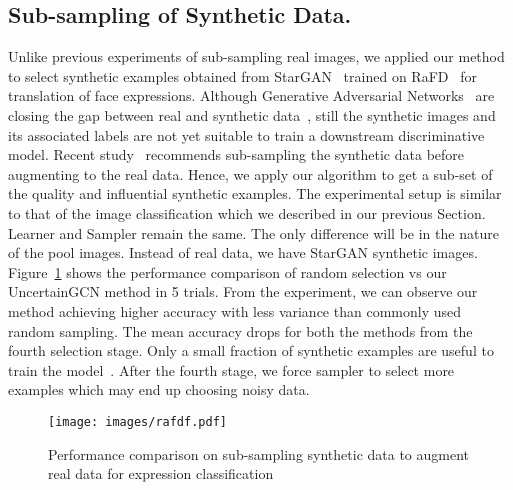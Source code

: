\subsection{Sub-sampling of Synthetic Data.} 


Unlike previous experiments of sub-sampling real images, we applied our method to select synthetic examples obtained from StarGAN~\cite{choi2018stargan} trained on RaFD~\cite{langner2010presentation} for translation of face 
expressions.
Although Generative Adversarial Networks~\cite{goodfellow2014generative} are closing the gap between real and synthetic data~\cite{ravuri2019seeing}, still the synthetic images and its associated labels are not 
yet suitable to train a downstream discriminative model. Recent study~\cite{bhattarai2020sampling} recommends sub-sampling the synthetic data before augmenting to the real data. Hence, we apply our algorithm to get a sub-set of the quality and influential synthetic examples. The experimental 
setup is similar to that of the image classification which we described in our previous Section. Learner and Sampler remain the same. 
The only difference will be in the nature of the pool images. Instead of real data, we have StarGAN 
synthetic images.
Figure~\ref{fig:rafd} shows the performance comparison of random selection vs our UncertainGCN method in 5 trials. From the experiment, we can observe our method achieving higher accuracy with less variance than commonly used random sampling. The mean accuracy drops for both the methods from the fourth selection stage. 
Only a small fraction of synthetic examples are useful to train the model~\cite{bhattarai2020sampling}. After the fourth stage, we force sampler to select more examples which may end up choosing noisy data.


\begin{figure}
    \centering
    \texttt{[image: images/rafdf.pdf]}
    \caption{Performance comparison on sub-sampling synthetic data to augment real data for expression classification}
    \label{fig:rafd}
\end{figure}



























